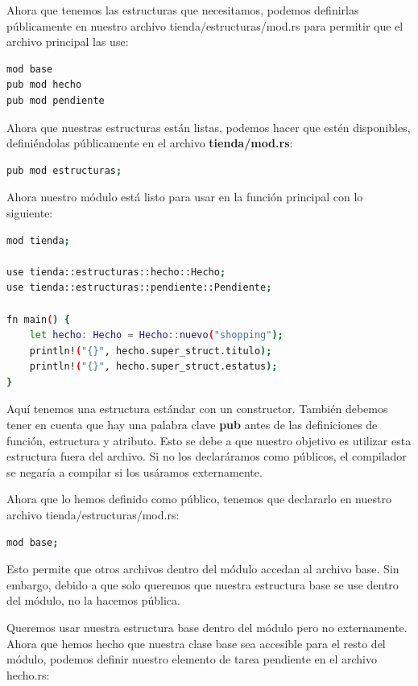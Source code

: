 Ahora que tenemos las estructuras que necesitamos, podemos definirlas públicamente en nuestro archivo tienda/estructuras/mod.rs para permitir que el archivo principal las use:

\begin{lstlisting}[language=bash]
mod base
pub mod hecho
pub mod pendiente
\end{lstlisting}

Ahora que nuestras estructuras están listas, podemos hacer que estén disponibles, definiéndolas públicamente en el archivo \textbf{tienda/mod.rs}:

\begin{lstlisting}[language=bash]
pub mod estructuras;
\end{lstlisting}


Ahora nuestro módulo está listo para usar en la función principal con lo siguiente:

\begin{lstlisting}[language=bash]
mod tienda;

use tienda::estructuras::hecho::Hecho;
use tienda::estructuras::pendiente::Pendiente;

fn main() {
	let hecho: Hecho = Hecho::nuevo("shopping");
	println!("{}", hecho.super_struct.titulo);
	println!("{}", hecho.super_struct.estatus);
}
\end{lstlisting}

Aquí tenemos una estructura estándar con un constructor. También debemos tener en cuenta que hay una palabra clave \textbf{pub} antes de las definiciones de función, estructura y atributo. Esto se debe a que nuestro objetivo es utilizar esta estructura fuera del archivo. Si no los declaráramos como públicos, el compilador se negaría a compilar si los usáramos externamente.

Ahora que lo hemos definido como público, tenemos que declararlo en nuestro archivo tienda/estructuras/mod.rs:

\begin{lstlisting}[language=bash]
mod base;	
\end{lstlisting}

Esto permite que otros archivos dentro del módulo accedan al archivo base. Sin embargo, debido a que solo queremos que nuestra estructura base se use dentro del módulo, no la hacemos pública.

Queremos usar nuestra estructura base dentro del módulo pero no externamente. Ahora que hemos hecho que nuestra clase base sea accesible para el resto del módulo, podemos definir nuestro elemento de tarea pendiente en el archivo hecho.rs:

